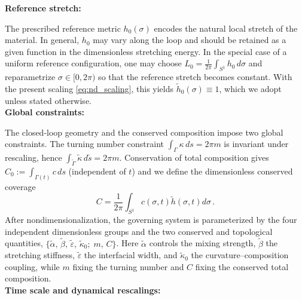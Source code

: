 \documentclass[
aip,
jcp,
reprint, 
floatfix
]{revtex4-1}
\begin{document}
\textbf{Reference stretch:}

The prescribed reference metric $h_0(\sigma)$ encodes the natural local stretch of the material.
In general, $h_0$ may vary along the loop and should be retained as a given function in the
dimensionless stretching energy. In the special case of a uniform reference configuration,
one may choose $L_0=\tfrac{1}{2\pi}\int_{S^1}h_0\,d\sigma$ and reparametrize $\sigma\in[0,2\pi)$ so that the
reference stretch becomes constant. With the present scaling \eqref{eq:nd_scaling}, this yields
$
\tilde{h}_0(\sigma)\equiv 1
$, which we adopt unless stated otherwise.\\

\textbf{Global constraints:}

The closed-loop geometry and the conserved composition impose two global constraints.
The turning number constraint
$
\int_{\Gamma}\kappa\,ds = 2\pi m
$
is invariant under rescaling, hence $\int_{\tilde{\Gamma}}\tilde{\kappa}\,d\tilde{s} = 2\pi m$.
Conservation of total composition gives
$C_0 := \int_{\Gamma(t)} c\,ds$ (independent of $t$)
and we define the dimensionless conserved coverage
\begin{equation}
C=\frac{1}{2 \pi} \int_{S^1} c(\sigma, t) \tilde{h}(\sigma, t) d \sigma\,.
\label{eq:mass_nd}
\end{equation}
After nondimensionalization, the governing system is parameterized by the four independent
dimensionless groups and the two conserved and topological quantities,
$\{\tilde{\alpha},\,\tilde{\beta},\,\tilde{\varepsilon},\,\tilde{\kappa}_0;\; m,\,{C}\}$.
Here $\tilde{\alpha}$ controls the mixing strength, $\tilde{\beta}$ the stretching stiffness,
$\tilde{\varepsilon}$ the interfacial width, and $\tilde{\kappa}_0$ the curvature--composition coupling,
while $m$ fixing the turning number and ${C}$ fixing the conserved total composition.\\

{\bf Time scale and dynamical rescalings:}
\end{document}
